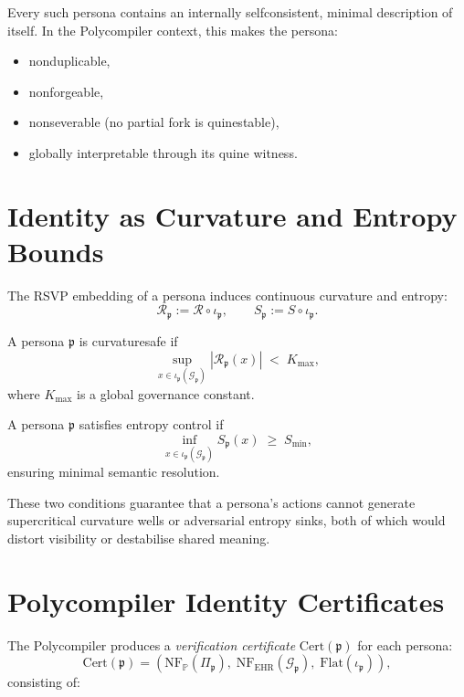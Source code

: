 Every such persona contains an internally self\textendash consistent,
minimal description of itself.  
In the Polycompiler context,
this makes the persona:

\begin{itemize}
  \item non\textendash duplicable,
  \item non\textendash forgeable,
  \item non\textendash severable (no partial fork is quine\textendash stable),
  \item globally interpretable through its quine witness.
\end{itemize}

\section{Identity as Curvature and Entropy Bounds}

The RSVP embedding of a persona induces continuous curvature and entropy:
\[
\mathcal{R}_{\mathfrak{p}}
  := \mathcal{R} \circ \iota_{\mathfrak{p}},\qquad
S_{\mathfrak{p}}
  := S \circ \iota_{\mathfrak{p}}.
\]

\begin{definition}
A persona $\mathfrak{p}$ is curvature\textendash safe if
\[
\sup_{x \in \iota_{\mathfrak{p}}(\mathcal{G}_{\mathfrak{p}})}
|\mathcal{R}_{\mathfrak{p}}(x)| \;<\; K_{\max},
\]
where $K_{\max}$ is a global governance constant.
\end{definition}

\begin{definition}
A persona $\mathfrak{p}$ satisfies entropy control if
\[
\inf_{x \in \iota_{\mathfrak{p}}(\mathcal{G}_{\mathfrak{p}})} 
S_{\mathfrak{p}}(x) \;\ge\; S_{\min},
\]
ensuring minimal semantic resolution.
\end{definition}

These two conditions guarantee that a persona’s actions cannot generate
supercritical curvature wells or adversarial entropy sinks,
both of which would distort visibility or destabilise shared meaning.

\section{Polycompiler Identity Certificates}

The Polycompiler produces a \emph{verification certificate} $\mathrm{Cert}(\mathfrak{p})$
for each persona:
\[
\mathrm{Cert}(\mathfrak{p})
  = \left(
      \mathrm{NF}_{\mathbb{P}}(\Pi_{\mathfrak{p}}),\;
      \mathrm{NF}_{\mathrm{EHR}}(\mathcal{G}_{\mathfrak{p}}),\;
      \mathrm{Flat}(\iota_{\mathfrak{p}})
    \right),
\]
consisting of:

